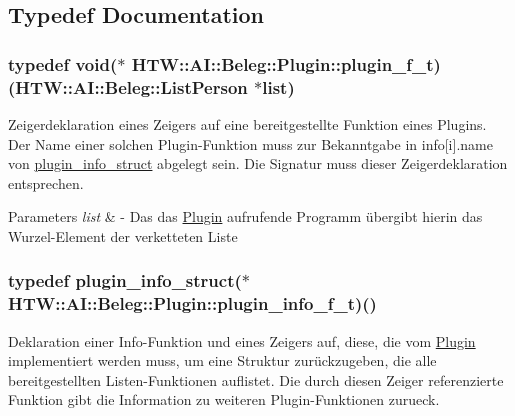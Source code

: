\subsection{Typedef Documentation}
\hypertarget{namespace_h_t_w_1_1_a_i_1_1_beleg_1_1_plugin_ac175157f4a126a99ff03cec00c4dd9ec}{
\subsubsection[{plugin\-\_\-f\-\_\-t}]{\setlength{\rightskip}{0pt plus 5cm}typedef void($\ast$ H\-T\-W\-::\-A\-I\-::\-Beleg\-::\-Plugin\-::plugin\-\_\-f\-\_\-t)({\bf H\-T\-W\-::\-A\-I\-::\-Beleg\-::\-List\-Person} $\ast$list)}}\label{namespace_h_t_w_1_1_a_i_1_1_beleg_1_1_plugin_ac175157f4a126a99ff03cec00c4dd9ec}
Zeigerdeklaration eines Zeigers auf eine bereitgestellte Funktion eines Plugins. Der Name einer solchen Plugin-\/\-Funktion muss zur Bekanntgabe in info\mbox{[}i\mbox{]}.name von \hyperlink{struct_h_t_w_1_1_a_i_1_1_beleg_1_1_plugin_1_1plugin__info__struct}{plugin\-\_\-info\-\_\-struct} abgelegt sein. Die Signatur muss dieser Zeigerdeklaration entsprechen. 
\begin{DoxyParams}{Parameters}
{\em list} & -\/ Das das \hyperlink{namespace_h_t_w_1_1_a_i_1_1_beleg_1_1_plugin}{Plugin} aufrufende Programm übergibt hierin das Wurzel-\/\-Element der verketteten Liste \\
\hline
\end{DoxyParams}
\hypertarget{namespace_h_t_w_1_1_a_i_1_1_beleg_1_1_plugin_a2d6055f756d6fbaacb016a64b2632b6a}{
\subsubsection[{plugin\-\_\-info\-\_\-f\-\_\-t}]{\setlength{\rightskip}{0pt plus 5cm}typedef {\bf plugin\-\_\-info\-\_\-struct}($\ast$ H\-T\-W\-::\-A\-I\-::\-Beleg\-::\-Plugin\-::plugin\-\_\-info\-\_\-f\-\_\-t)()}}\label{namespace_h_t_w_1_1_a_i_1_1_beleg_1_1_plugin_a2d6055f756d6fbaacb016a64b2632b6a}
Deklaration einer Info-\/\-Funktion und eines Zeigers auf, diese, die vom \hyperlink{namespace_h_t_w_1_1_a_i_1_1_beleg_1_1_plugin}{Plugin} implementiert werden muss, um eine Struktur zurückzugeben, die alle bereitgestellten Listen-\/\-Funktionen auflistet. Die durch diesen Zeiger referenzierte Funktion gibt die Information zu weiteren Plugin-\/\-Funktionen zurueck.

